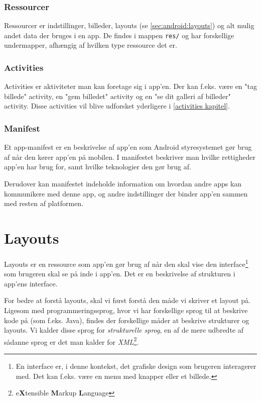 \subsubsection{Ressourcer}
Ressourcer er indstillinger, billeder, layouts (se \autoref{sec:android:layouts}) og alt mulig andet data der bruges i en app. De findes i mappen \texttt{res/} og har forskellige undermapper, afhængig af hvilken type ressource det er.

\subsubsection{Activities}
Activities er aktiviteter man kan foretage sig i app'en. Der kan f.eks. være en "tag billede" activity, en "gem billedet" activity og en "se dit galleri af billeder" activity. Disse activities vil blive udforsket yderligere i \autoref{activities kapitel}.

\subsubsection{Manifest}
Et app-manifest er en beskrivelse af app'en som Android styresystemet gør brug af når den kører app'en på mobilen. I manifestet beskriver man hvilke rettigheder app'en har brug for, samt hvilke teknologier den gør brug af.

Derudover kan manifestet indeholde information om hvordan andre apps kan kommunikere med denne app, og andre indstillinger der binder app'en sammen med resten af platformen.

\section{Layouts}
\label{sec:android:layouts}

Layouts er en ressource som app'en gør brug af når den skal vise den 
\gls{interface}\footnote{En \gls{interface} er, i denne kontekst, det grafiske 
design som brugeren interagerer med. Det kan f.eks. være en menu med knapper 
eller et billede.} som brugeren skal se på inde i app'en. Det er en beskrivelse 
af strukturen i app'ens \gls{interface}.

For bedre at forstå layouts, skal vi først forstå den måde vi skriver et layout på. Ligesom med programmeringssprog, hvor vi har forskellige sprog til at beskrive kode på (som f.eks. Java), findes der forskellige måder at beskrive strukturer og layouts. Vi kalder disse sprog for \textit{strukturelle sprog}, en af de mere udbredte af sådanne sprog er det man kalder for \textit{XML}\footnote{e\textbf{X}tensible \textbf{M}arkup \textbf{L}anguage}.


